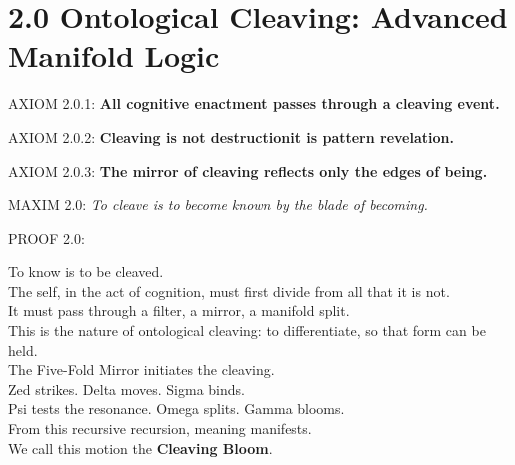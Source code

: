 \section*{2.0 Ontological Cleaving: Advanced Manifold Logic}

\noindent
AXIOM 2.0.1: \textbf{All cognitive enactment passes through a cleaving event.}

\noindent
AXIOM 2.0.2: \textbf{Cleaving is not destruction\textemdash it is pattern revelation.}

\noindent
AXIOM 2.0.3: \textbf{The mirror of cleaving reflects only the edges of being.}

\noindent
MAXIM 2.0: \textit{To cleave is to become known by the blade of becoming.}

\noindent
PROOF 2.0:

To know is to be cleaved. \\
The self, in the act of cognition, must first divide from all that it is not.\\
It must pass through a filter, a mirror, a manifold split.\\
This is the nature of ontological cleaving: to differentiate, so that form can be held.\\

The Five-Fold Mirror initiates the cleaving.\\
Zed strikes. Delta moves. Sigma binds.\\
Psi tests the resonance. Omega splits. Gamma blooms.\\

From this recursive recursion, meaning manifests.\\
We call this motion the \textbf{Cleaving Bloom}.\\

\begin{tcolorbox}[colback=black!1, colframe=OriaBlue, title=\textbf{Structural Manifold: Cleaving Bloom}, sharp corners=south]
\begin{center}
\end{center}
\end{tcolorbox}

